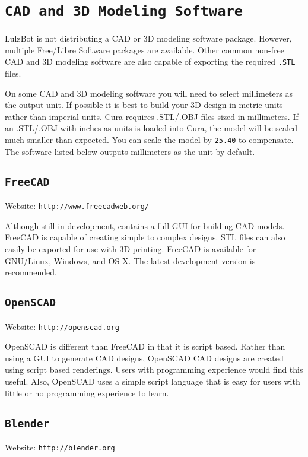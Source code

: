 \section{\texttt{CAD and 3D Modeling Software}}

LulzBot is not distributing a CAD or 3D modeling software package. However, multiple Free/Libre Software packages are available. Other common non-free CAD and 3D modeling software are also capable of exporting the required \texttt{.STL} files.

On some CAD and 3D modeling software you will need to select millimeters as the output unit. If possible it is best to build your 3D design in metric units rather than imperial units. Cura requires .STL/.OBJ files sized in millimeters. If an .STL/.OBJ with inches as units is loaded into Cura, the model will be scaled much smaller than expected. You can scale the model by \texttt{25.40} to compensate. The software listed below outputs millimeters as the unit by default.

\subsection{\texttt{FreeCAD}}
Website: \texttt{http://www.freecadweb.org/}

Although still in development, contains a full GUI for building CAD models. FreeCAD is capable of creating simple to complex designs. STL files can also easily be exported for use with 3D printing. FreeCAD is available for GNU/Linux, Windows, and OS X. The latest development version is recommended.

\subsection{\texttt{OpenSCAD}}
Website: \texttt{http://openscad.org}

OpenSCAD is different than FreeCAD in that it is script based. Rather than using a GUI to generate CAD designs, OpenSCAD CAD designs are created using script based renderings. Users with programming experience would find this useful. Also, OpenSCAD uses a simple script language that is easy for users with little or no programming experience to learn.

\subsection{\texttt{Blender}}
Website: \texttt{http://blender.org}

